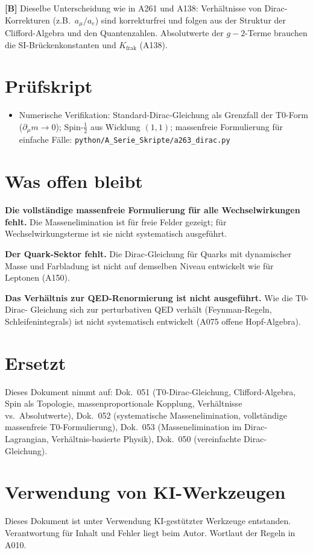 \textbf{[B]} Dieselbe Unterscheidung wie in A261 und A138: Verhältnisse von
Dirac-Korrekturen (z.B.\ $a_\mu/a_e$) sind korrekturfrei und folgen aus der Struktur
der Clifford-Algebra und den Quantenzahlen. Absolutwerte der $g-2$-Terme brauchen die
SI-Brückenkonstanten und $K_\text{frak}$ (A138).

\section{Prüfskript}

\begin{itemize}[leftmargin=2em,itemsep=2pt,topsep=2pt]
  \item Numerische Verifikation: Standard-Dirac-Gleichung als Grenzfall der T0-Form
    ($\partial_\mu m\to0$); Spin-$\tfrac12$ aus Wicklung $(1,1)$; massenfreie
    Formulierung für einfache Fälle:
    \texttt{python/A\_Serie\_Skripte/a263\_dirac.py}
\end{itemize}

\section{Was offen bleibt}

\textbf{Die vollständige massenfreie Formulierung für alle Wechselwirkungen fehlt.}
Die Massenelimination ist für freie Felder gezeigt; für Wechselwirkungsterme ist sie
nicht systematisch ausgeführt.

\textbf{Der Quark-Sektor fehlt.} Die Dirac-Gleichung für Quarks mit dynamischer Masse
und Farbladung ist nicht auf demselben Niveau entwickelt wie für Leptonen (A150).

\textbf{Das Verhältnis zur QED-Renormierung ist nicht ausgeführt.} Wie die T0-Dirac-
Gleichung sich zur perturbativen QED verhält (Feynman-Regeln, Schleifenintegrals) ist
nicht systematisch entwickelt (A075 offene Hopf-Algebra).

\section{Ersetzt}

Dieses Dokument nimmt auf: Dok.~051 (T0-Dirac-Gleichung, Clifford-Algebra, Spin als
Topologie, massenproportionale Kopplung, Verhältnisse vs.\ Absolutwerte), Dok.~052
(systematische Massenelimination, vollständige massenfreie T0-Formulierung), Dok.~053
(Massenelimination im Dirac-Lagrangian, Verhältnis-basierte Physik), Dok.~050
(vereinfachte Dirac-Gleichung).

\section{Verwendung von KI-Werkzeugen}

Dieses Dokument ist unter Verwendung KI-gestützter Werkzeuge entstanden. Verantwortung
für Inhalt und Fehler liegt beim Autor. Wortlaut der Regeln in A010.
